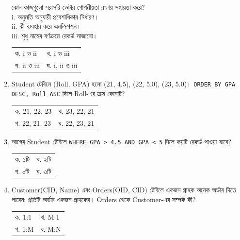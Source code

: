 \begin{multicols}{2}
\begin{enumerate}[resume]
\begin{minipage}[t]{\linewidth}
কোন কাজগুলো সরাসরি ডেটার গোপনীয়তা রক্ষায় সহায়তা করে?\\ i. অনুমতি অনুযায়ী প্রবেশাধিকার নির্ধারণ।\\ ii. কী ব্যবহার করে এনক্রিপশন।\\ iii. শুধু নামের বর্ণক্রমে রেকর্ড সাজানো।
\par
\begin{tabularx}{\linewidth}{@{}X X@{}}
ক. i ও ii & খ. i ও iii \\
গ. ii ও iii & ঘ. i, ii ও iii \\
\end{tabularx}
\end{minipage}
\vspace{1pt}
\item \begin{minipage}[t]{\linewidth}
Student টেবিলে (Roll, GPA) হলো (21, 4.5), (22, 5.0), (23, 5.0)। \texttt{ORDER BY GPA DESC, Roll ASC} দিলে Roll-এর ক্রম কোনটি?
\par
\begin{tabularx}{\linewidth}{@{}X X@{}}
ক. 21, 22, 23 & খ. 23, 22, 21 \\
গ. 22, 21, 23 & ঘ. 22, 23, 21 \\
\end{tabularx}
\end{minipage}
\vspace{1pt}
\item \begin{minipage}[t]{\linewidth}
আগের Student টেবিলে \texttt{WHERE GPA > 4.5 AND GPA < 5} দিলে কয়টি রেকর্ড পাওয়া যাবে?
\par
\begin{tabularx}{\linewidth}{@{}X X@{}}
ক. ১টি & খ. ২টি \\
গ. ০টি & ঘ. ৩টি \\
\end{tabularx}
\end{minipage}
\vspace{1pt}
\item \begin{minipage}[t]{\linewidth}
Customer(CID, Name) এবং Orders(OID, CID) টেবিলে একজন গ্রাহক অনেক অর্ডার দিতে পারেন; প্রতিটি অর্ডার একজন গ্রাহকের। Orders থেকে Customer-এর সম্পর্ক কী?
\par
\begin{tabularx}{\linewidth}{@{}X X@{}}
ক. 1:1 & খ. M:1 \\
গ. 1:M & ঘ. M:N \\
\end{tabularx}
\end{minipage}

\end{enumerate}
\end{multicols}
